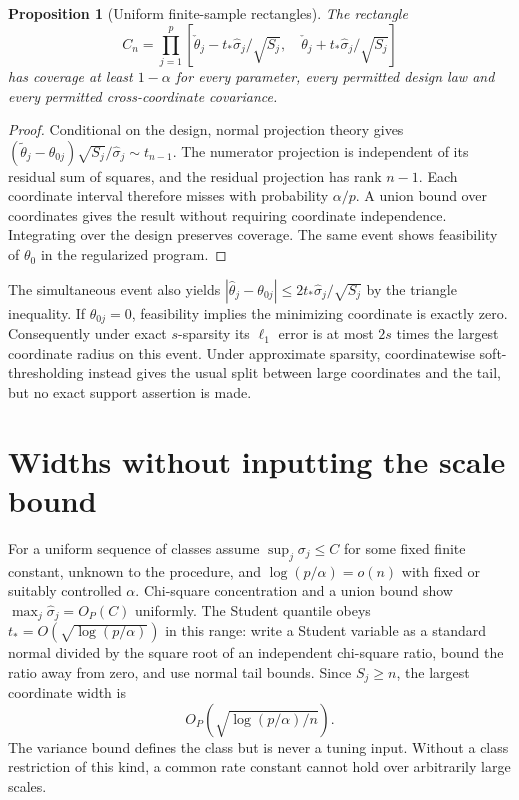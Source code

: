 \documentclass[11pt]{article}
\newtheorem{proposition}{Proposition}
\begin{document}
\begin{proposition}[Uniform finite-sample rectangles]
The rectangle
\[
 C_n=\prod_{j=1}^p\left[
 \check\theta_j-t_*\widehat\sigma_j/\sqrt{S_j},\quad
 \check\theta_j+t_*\widehat\sigma_j/\sqrt{S_j}\right]
\]
has coverage at least $1-\alpha$ for every parameter, every permitted design law and every permitted cross-coordinate covariance.
\end{proposition}
\begin{proof}
Conditional on the design, normal projection theory gives
$(\widetilde\theta_j-\theta_{0j})\sqrt{S_j}/\widehat\sigma_j
\sim t_{n-1}$.
The numerator projection is independent of its residual sum of squares, and the residual projection has rank $n-1$. Each coordinate interval therefore misses with probability $\alpha/p$. A union bound over coordinates gives the result without requiring coordinate independence. Integrating over the design preserves coverage. The same event shows feasibility of $\theta_0$ in the regularized program.
\end{proof}
The simultaneous event also yields
$|\widehat\theta_j-\theta_{0j}|\leq2t_*\widehat\sigma_j/\sqrt{S_j}$
by the triangle inequality. If $\theta_{0j}=0$, feasibility implies the minimizing coordinate is exactly zero. Consequently under exact $s$-sparsity its $\ell_1$ error is at most $2s$ times the largest coordinate radius on this event. Under approximate sparsity, coordinatewise soft-thresholding instead gives the usual split between large coordinates and the tail, but no exact support assertion is made.

\section*{Widths without inputting the scale bound}
For a uniform sequence of classes assume $\sup_j\sigma_j\leq C$ for some fixed finite constant, unknown to the procedure, and $\log(p/\alpha)=o(n)$ with fixed or suitably controlled $\alpha$. Chi-square concentration and a union bound show
$\max_j\widehat\sigma_j=O_P(C)$ uniformly. The Student quantile obeys $t_*=O(\sqrt{\log(p/\alpha)})$ in this range: write a Student variable as a standard normal divided by the square root of an independent chi-square ratio, bound the ratio away from zero, and use normal tail bounds. Since $S_j\geq n$, the largest coordinate width is
\[
                         O_P\!\left(\sqrt{\log(p/\alpha)/n}\right).
\]
The variance bound defines the class but is never a tuning input. Without a class restriction of this kind, a common rate constant cannot hold over arbitrarily large scales.
\end{document}
